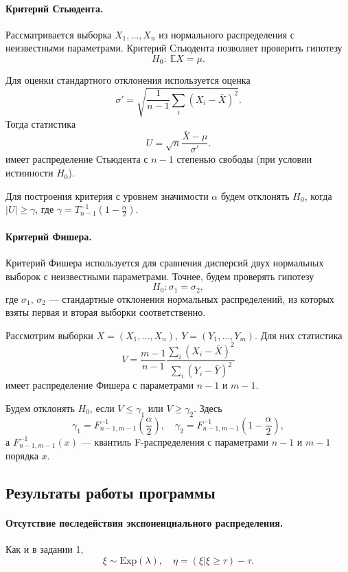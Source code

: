 \documentclass[16pt]{article}
\begin{document}
\paragraph{Критерий Стьюдента.}
Рассматривается выборка $X_1, \ldots, X_n$ из нормального распределения с неизвестными параметрами. Критерий Стьюдента позволяет проверить гипотезу
$$H_0\colon\ \mathbb{E}X = \mu.$$

Для оценки стандартного отклонения используется оценка
$$\sigma' = \sqrt{\dfrac{1}{n-1}\sum_i(X_i - \bar X)^2}.$$
Тогда статистика
$$U = \sqrt{n}\frac{\bar X - \mu}{\sigma'}.$$
имеет распределение Стьюдента с $n - 1$ степенью свободы (при условии истинности $H_0$).

Для построения критерия с уровнем значимости $\alpha$ будем отклонять $H_0$,
когда $|U| \geq \gamma$, где $\gamma = T_{n - 1}^{-1}\left(1 - \frac{\alpha}{2}\right).$

\paragraph{Критерий Фишера.}
Критерий Фишера используется для сравнения дисперсий двух нормальных выборок с неизвестными параметрами. Точнее, будем проверять гипотезу
$$H_0\colon \sigma_1 = \sigma_2,$$
где $\sigma_1, \, \sigma_2$ --- стандартные отклонения нормальных распределений, из которых взяты первая и вторая выборки соответственно.

Рассмотрим выборки $X = (X_1, \ldots, X_n), \ Y = (Y_1, \ldots, Y_m)$. Для них статистика
$$ V = \dfrac{m-1}{n-1}\dfrac{\sum_i(X_i - \bar X)^2}{\sum_i(Y_i - \bar Y)^2}$$ 
имеет распределение Фишера с параметрами $n - 1$ и $m - 1$.

Будем отклонять $H_0$, если $V \leq \gamma_1$ или $V \geq \gamma_2$. Здесь
$$\gamma_1 = F_{n-1, m-1}^{-1}\left(\frac{\alpha}{2}\right), \quad
\gamma_2 = F_{n-1, m-1}^{-1}\left(1 - \frac{\alpha}{2}\right),$$  а $F_{n-1, m-1}^{-1}(x)$ --- квантиль F-распределения с параметрами $n - 1$ и $m - 1$ порядка $x$.
\subsection{Результаты работы программы}

\paragraph{Отсутствие последействия экспоненциального распределения.} 
Как и в задании 1,
$$\xi \sim \mathrm{Exp}(\lambda), \quad \eta = (\xi | \xi \geq \tau) - \tau.$$ 
\end{document}
